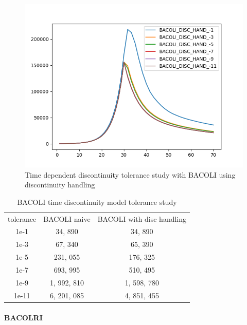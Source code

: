 \documentclass{article}
\begin{document}
\begin{figure}[H]
\centering
\includegraphics[width=0.7\linewidth]{./figures/pde_time_disc_bacoli_disc_hand_tol}
\caption{Time dependent discontinuity tolerance study with BACOLI using discontinuity handling}
\label{fig:pde_time_disc_bacoli_disc_hand_tol}
\end{figure}

\begin{table}[h]
\caption {BACOLI time discontinuity model tolerance study} 
\label{tab:BACOLI_time_tolerance}
\begin{center}
\begin{tabular}{ c c c } 
tolerance  & BACOLI naive & BACOLI with disc handling\\ 
1e-1       & 34, 890        &   34, 890     \\
1e-3       & 67, 340        &   65, 390   \\
1e-5       & 231, 055       &   176, 325    \\
1e-7       & 693, 995       &   510, 495    \\
1e-9       & 1, 992, 810      &   1, 598, 780    \\
1e-11      & 6, 201, 085      &   4, 851, 455   \\
\end{tabular}
\end{center}
\end{table}

\paragraph{BACOLRI}
\end{document}
